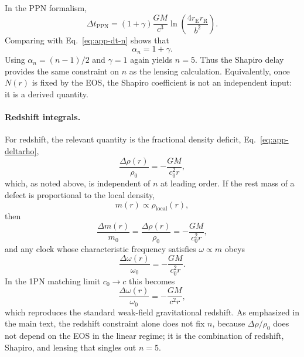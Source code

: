 \documentclass[11pt]{article}
\begin{document}
In the PPN formalism,
\begin{equation}
  \Delta t_{\text{PPN}}
  = (1+\gamma)\frac{GM}{c^3}
    \ln\!\left(\frac{4 r_\mathrm{E} r_\mathrm{R}}{b^2}\right).
\end{equation}
Comparing with Eq.~\eqref{eq:app-dt-n} shows that
\begin{equation}
  \alpha_n = 1 + \gamma.
\end{equation}
Using $\alpha_n = (n-1)/2$ and $\gamma = 1$ again yields $n=5$.
Thus the Shapiro delay provides the same constraint on $n$ as the
lensing calculation.
Equivalently, once $N(r)$ is fixed by the EOS, the Shapiro coefficient
is not an independent input: it is a derived quantity.


\paragraph{Redshift integrals.}

For redshift, the relevant quantity is the fractional density deficit,
Eq.~\eqref{eq:app-deltarho},
\begin{equation}
  \frac{\Delta\rho(r)}{\rho_0}
  = -\frac{GM}{c_0^2 r},
\end{equation}
which, as noted above, is independent of $n$ at leading order.
If the rest mass of a defect is proportional to the local density,
\begin{equation}
  m(r) \propto \rho_{\text{local}}(r),
\end{equation}
then
\begin{equation}
  \frac{\Delta m(r)}{m_0}
  = \frac{\Delta\rho(r)}{\rho_0}
  = -\frac{GM}{c_0^2 r},
\end{equation}
and any clock whose characteristic frequency satisfies $\omega\propto m$
obeys
\begin{equation}
  \frac{\Delta\omega(r)}{\omega_0}
  = -\frac{GM}{c_0^2 r}.
\end{equation}
In the 1PN matching limit $c_0\to c$ this becomes
\begin{equation}
  \frac{\Delta\omega(r)}{\omega_0}
  = -\frac{GM}{c^2 r},
\end{equation}
which reproduces the standard weak-field gravitational redshift.
As emphasized in the main text, the redshift constraint alone does not
fix $n$, because $\Delta\rho/\rho_0$ does not depend on the EOS in the
linear regime; it is the combination of redshift, Shapiro, and lensing
that singles out $n=5$.

\end{document}
